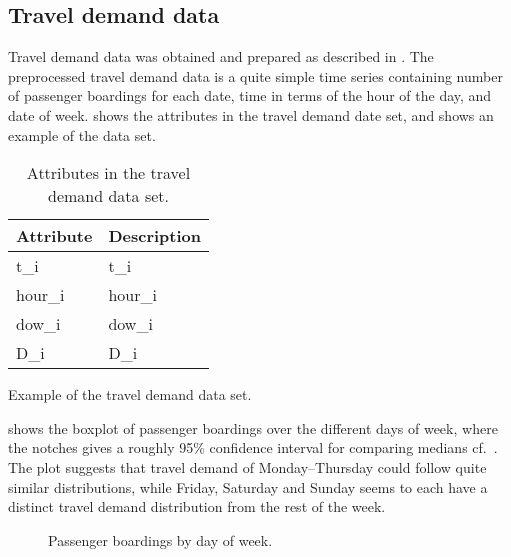 
\subsection{Travel demand data}\label{ch:desc_traveldemand}

Travel demand data was obtained and prepared as described in . The preprocessed travel demand data is a quite simple time series containing number of passenger boardings for each date, time in terms of the hour of the day, and date of week.  shows the attributes in the travel demand date set, and  shows an example of the data set.

\begin{table}[!ht]
    \center
    \begin{tabular}{p{.7in}p{4.5in}}        
        Attribute & Description \\
        \hline 
        \hline         
        \gls{t_i} & \glsdesc{t_i} \\
        \hline 
        \gls{hour_i} & \glsdesc{hour_i} \\
        \hline 
        \gls{dow_i} & \glsdesc{dow_i} \\
        \hline 
        \gls{D_i} & \glsdesc{D_i}  \\
    \end{tabular}
    \caption{Attributes in the travel demand data set.}
    \label{tab:travel_demand_data_attr}
\end{table}

\begin{table}[!ht]
    \center
    
    \caption{Example of the travel demand data set.}
    \label{tab:travel_demand_data_example}
\end{table}


 shows the boxplot of passenger boardings over the different days of week, where the notches gives a roughly 95\% confidence interval for comparing medians cf.~\citet{Boxplots}. The plot suggests that travel demand of Monday--Thursday could follow quite similar distributions, while Friday, Saturday and Sunday seems to each have a distinct travel demand distribution from the rest of the week.

\begin{figure}[!ht]
    \center
    
    \vspace{-2em}
    \caption{Passenger boardings by day of week.}
    \label{fig:travelcard_boxplot}
\end{figure}


